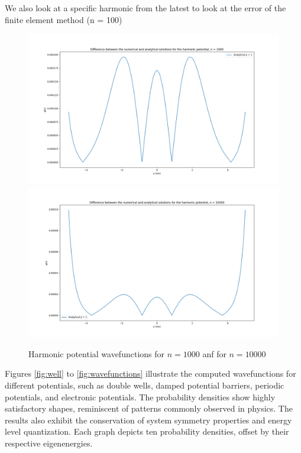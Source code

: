 \documentclass[12pt,french]{article}
\begin{document}
We also look at a specific harmonic from the latest to look at the error of the finite element method (n = 100)



\begin{figure}[h!]
  \centering
  \includegraphics[width=0.45\linewidth]{Partie_I/Harmonic_Potential_n1000.png}
  \hfill
  \includegraphics[width=0.45\linewidth]{Partie_I/PartieI_potentiel_harmonique_n10000.png}
  \caption{Harmonic potential wavefunctions for $n = 1000$ anf for $n = 10000$}
  \label{fig:harmonic-potential-n1000}
\end{figure}

Figures \ref{fig:well} to \ref{fig:wavefunctions} illustrate the computed wavefunctions for different potentials, such as double wells, damped potential barriers, periodic potentials, and electronic potentials. The probability densities show highly satisfactory shapes, reminiscent of patterns commonly observed in physics. The results also exhibit the conservation of system symmetry properties and energy level quantization. Each graph depicts ten probability densities, offset by their respective eigenenergies.
\end{document}
